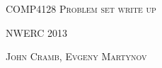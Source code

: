 \documentclass[a4paper]{article}
\begin{document}
\titlepage
\begin{center}
    \huge\textsc{COMP4128 Problem set write up}

    \vspace{8cm}
    \huge\textsc{NWERC 2013}

    \vspace{2cm}
    \large\textsc{John Cramb, Evgeny Martynov}
\end{center}











\end{document}
